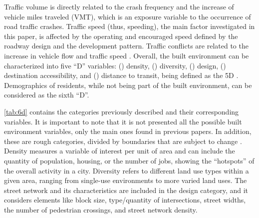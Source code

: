 Traffic volume is directly related to the crash frequency and the increase of vehicle miles traveled (VMT), which is an exposure variable to the occurrence of road traffic crashes. Traffic speed (thus, speeding), the main factor investigated in this paper, is affected by the operating and encouraged speed defined by the roadway design and the development pattern. Traffic conflicts are related to the increase in vehicle flow and traffic speed \cite{Ewing2009}. Overall, the built environment can be characterized into five ``D'' variables: () density, () diversity, () design, () destination accessibility, and () distance to transit, being defined as the 5D \cite{Ewing2010}. Demographics of residents, while not being part of the built environment, can be considered as the sixth ``D''. 





\autoref{tab:6d} contains the categories previously described and their corresponding variables. It is important to note that it is not presented all the possible built environment variables, only the main ones found in previous papers. In addition, these are rough categories, divided by boundaries that are subject to change \cite{Ewing2010}. Density measures a variable of interest per unit of area and can include the quantity of population, housing, or the number of jobs, showing the ``hotspots'' of the overall activity in a city. Diversity refers to different land use types within a given area, ranging from single-use environments to more varied land uses. The street network and its characteristics are included in the design category, and it considers elements like block size, type/quantity of intersections, street widths, the number of pedestrian crossings, and street network density.

